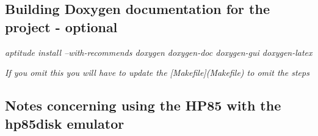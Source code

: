 \subsection*{Building Doxygen documentation for the project -\/ optional}


\begin{DoxyItemize}
\item {\itshape aptitude install --with-\/recommends doxygen doxygen-\/doc doxygen-\/gui doxygen-\/latex}
\item {\itshape If you omit this you will have to update the \mbox{[}Makefile\mbox{]}(Makefile) to omit the steps}
\end{DoxyItemize}





\subsection*{Notes concerning using the H\+P85 with the hp85disk emulator}


